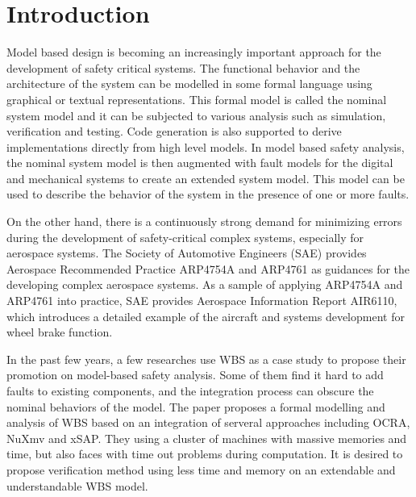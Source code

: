 \section{Introduction}
Model based design is becoming an increasingly important approach for the development of safety critical systems.
The functional behavior and the architecture of the system can be modelled in some formal language using graphical or textual representations.
This formal model is called the nominal system model and it can be subjected to various analysis such as simulation, verification and testing.
Code generation is also supported to derive implementations directly from high level models.
In model based safety analysis, the nominal system model is then augmented with fault models for the digital and mechanical systems to create an extended system model.
This model can be used to describe the behavior of the system in the presence of one or more faults.


On the other hand, there is a continuously strong demand for minimizing errors during the development of safety-critical complex systems\cite{lctes10}, especially for aerospace systems\cite{issrew12}.
The Society of Automotive Engineers (SAE) provides Aerospace Recommended Practice ARP4754A\cite{arp4754a} and ARP4761\cite{arp4761} as guidances for the developing complex aerospace systems. As a sample of applying ARP4754A and ARP4761 into practice, SAE provides Aerospace Information Report AIR6110\cite{air6110}, which introduces a detailed example of the aircraft and systems development for wheel brake function.

In the past few years, a few researches use WBS as a case study to propose their promotion on model-based safety analysis.
Some of them find it hard to add faults to existing components, and the integration process can obscure the nominal behaviors of the model.  The paper\cite{cav15} proposes a formal modelling and analysis of WBS based on an integration of serveral approaches including OCRA, NuXmv and xSAP. They using a cluster of machines with massive memories and time, but also faces with time out problems during computation. It is desired to propose verification method using less time and memory on an extendable and understandable WBS model.

